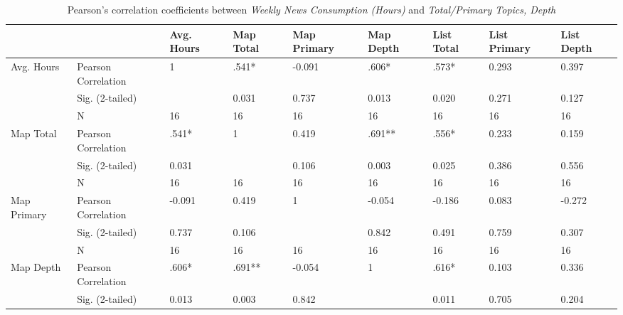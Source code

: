 \begin{landscape}
\clearpage

\begin{table}[hbtp!]
\centering
\caption{Pearson's correlation coefficients between \textit{Weekly News Consumption (Hours)} and \textit{Total/Primary Topics, Depth}}
\label{res:hourscorrelation}\vspace{0.3cm}
\begin{tabular}{|l|l|lllllll|}
\hline
                    &                     & Avg. Hours & Map Total & Map Primary & Map Depth & List Total & List Primary & List Depth \\ \hline
Avg. Hours & Pearson Correlation & 1                   & .541*     & -0.091      & .606*     & .573*      & 0.293        & 0.397      \\
                    & Sig. (2-tailed)     &                     & 0.031     & 0.737       & 0.013     & 0.020      & 0.271        & 0.127      \\
                    & N                   & 16                  & 16        & 16          & 16        & 16         & 16           & 16         \\
Map Total           & Pearson Correlation & .541*               & 1         & 0.419       & .691**    & .556*      & 0.233        & 0.159      \\
                    & Sig. (2-tailed)     & 0.031               &           & 0.106       & 0.003     & 0.025      & 0.386        & 0.556      \\
                    & N                   & 16                  & 16        & 16          & 16        & 16         & 16           & 16         \\
Map Primary         & Pearson Correlation & -0.091              & 0.419     & 1           & -0.054    & -0.186     & 0.083        & -0.272     \\
                    & Sig. (2-tailed)     & 0.737               & 0.106     &             & 0.842     & 0.491      & 0.759        & 0.307      \\
                    & N                   & 16                  & 16        & 16          & 16        & 16         & 16           & 16         \\
Map Depth           & Pearson Correlation & .606*               & .691**    & -0.054      & 1         & .616*      & 0.103        & 0.336      \\
                    & Sig. (2-tailed)     & 0.013               & 0.003     & 0.842       &           & 0.011      & 0.705        & 0.204      \\

\end{tabular}
\end{table}
\end{landscape}
